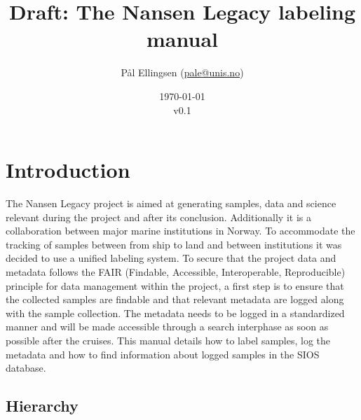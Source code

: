 \documentclass[a4paper,english, 11pt]{article}
\title{Draft: The Nansen Legacy labeling manual}
\date{\today\\v0.1}
\author{Pål Ellingsen (\url{pale@unis.no})}
\begin{document}
\maketitle
\tableofcontents
\section{Introduction} %
\label{sec:Introduction}

The Nansen Legacy project is aimed at generating samples, data and science relevant during the project and after its conclusion. Additionally it is a collaboration between major marine institutions in Norway. To accommodate the tracking of samples between from ship to land and  between institutions it was decided to use a unified labeling system. To secure that the project data and metadata follows the FAIR (Findable, Accessible, Interoperable, Reproducible) principle for data management within the project, a first step is to ensure that the collected samples are findable and that relevant metadata are logged
along with the sample collection. The metadata needs to be logged in a standardized manner and will be
made accessible through a search interphase as soon as possible after the cruises.  This manual details how to label samples, log the metadata and how to find information about logged samples in the SIOS database.  



\subsection{Hierarchy} %
\label{sub:Hirarcy}
\end{document}
